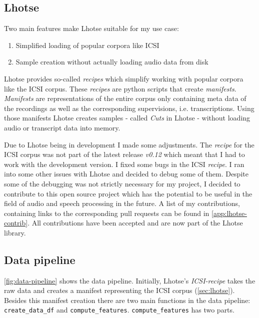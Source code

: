 \documentclass[bsc,frontabs,parskip,deptreport]{infthesis}
\begin{document}
\subsection{Lhotse} \label{sec:lhotse}
Two main features make Lhotse suitable for my use case:
\begin{enumerate}
    \item Simplified loading of popular corpora like ICSI
    \item Sample creation without actually loading audio data from disk
\end{enumerate}

Lhotse provides so-called \textit{recipes} which simplify working with popular corpora like the ICSI corpus.
These \textit{recipes} are python scripts that create \textit{manifests}.
\textit{Manifests} are representations of the entire corpus only containing meta data of the recordings as well as the corresponding supervisions, i.e. transcriptions.
Using those manifests Lhotse creates samples - called \textit{Cuts} in Lhotse - without loading audio or transcript data into memory. 

Due to Lhotse being in development I made some adjustments. The \textit{recipe} for the ICSI corpus was not part of the latest release \textit{v0.12} which meant that I had to work with the development version. 
I fixed some bugs in the ICSI \textit{recipe}. 
I ran into some other issues with Lhotse and decided to debug some of them. Despite some of the debugging was not strictly necessary for my project, I decided to contribute to this open source project which has the potential to be useful in the field of audio and speech processing in the future. A list of my contributions, containing links to the corresponding pull requests can be found in \autoref{app:lhotse-contrib}. All contributions have been accepted and are now part of the Lhotse library.

\subsection{Data pipeline} \label{sec:ml-data-pipeline}

\autoref{fig:data-pipeline} shows the data pipeline.
Initially, Lhotse's \textit{ICSI-recipe} takes the raw data and creates a manifest representing the ICSI corpus (\autoref{sec:lhotse}).
Besides this manifest creation there are two main functions in the data pipeline: \verb|create_data_df| and \verb|compute_features|. 
\verb|compute_features| has two parts.
\end{document}
